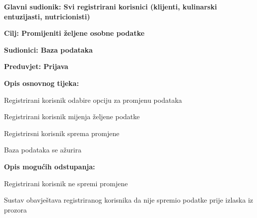 					\noindent {}
					\begin{packed_item}
	
						\item \textbf{Glavni sudionik: Svi registrirani korisnici (klijenti, kulinarski entuzijasti, nutricionisti)}
						\item  \textbf{Cilj: Promijeniti željene osobne podatke}
						\item  \textbf{Sudionici: Baza podataka}
						\item  \textbf{Preduvjet: Prijava } 
						\item  \textbf{Opis osnovnog tijeka:}
						
						\item[] \begin{packed_enum}
	
							\item Registrirani korisnik odabire opciju za promjenu podataka
					
							\item Registrirani korisnik mijenja željene podatke
							\item Registrirsni korisnik sprema promjene
							\item Baza podataka se ažurira
						\end{packed_enum}
						
						\item  \textbf{Opis mogućih odstupanja:}
						
						\item[] \begin{packed_item}
	
							\item[3.a] Registrirani korisnik ne spremi promjene
							\item[] \begin{packed_enum}
								
								\item Sustav obavještava registriranog korisnika da nije spremio podatke prije izlaska
iz prozora
								
							\end{packed_enum}
						\end{packed_item}
					\end{packed_item}
					
